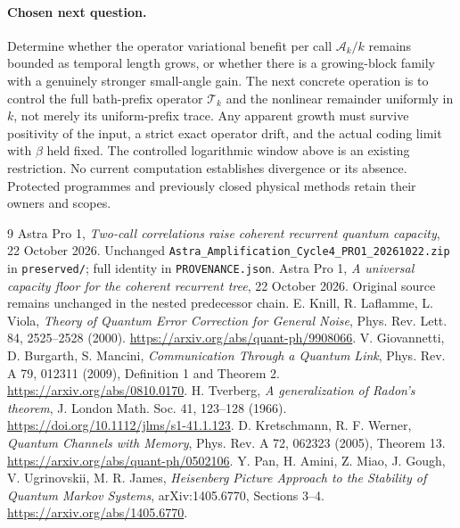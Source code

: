 \documentclass[11pt]{article}
\begin{document}
\paragraph{Chosen next question.}
Determine whether the operator variational benefit per call
$\mathcal A_k/k$ remains bounded as temporal length grows, or whether
there is a growing-block family with a genuinely stronger small-angle
gain. The next concrete operation is to control the full bath-prefix
operator $\mathcal T_k$ and the nonlinear remainder uniformly in $k$,
not merely its uniform-prefix trace.
Any apparent growth must survive positivity of the input, a strict exact
operator drift, and the actual coding limit with $\beta$ held fixed.
The controlled logarithmic window above is an existing restriction.
No current computation establishes divergence or its absence.
Protected programmes and previously closed physical methods retain
their owners and scopes.

\appendix

\begin{thebibliography}{9}\footnotesize
{} Astra Pro 1, \emph{Two-call correlations raise coherent
recurrent quantum capacity}, 22 October 2026.
Unchanged \texttt{Astra\_Amplification\_Cycle4\_PRO1\_20261022.zip}
in \texttt{preserved/}; full identity in \texttt{PROVENANCE.json}.
 Astra Pro 1, \emph{A universal capacity floor for the
coherent recurrent tree}, 22 October 2026. Original source remains
unchanged in the nested predecessor chain.
 E. Knill, R. Laflamme, L. Viola,
\emph{Theory of Quantum Error Correction for General Noise},
Phys. Rev. Lett. 84, 2525--2528 (2000).
\url{https://arxiv.org/abs/quant-ph/9908066}.
 V. Giovannetti, D. Burgarth, S. Mancini,
\emph{Communication Through a Quantum Link},
Phys. Rev. A 79, 012311 (2009), Definition 1 and Theorem 2.
\url{https://arxiv.org/abs/0810.0170}.
 H. Tverberg,
\emph{A generalization of Radon's theorem},
J. London Math. Soc. 41, 123--128 (1966).
\url{https://doi.org/10.1112/jlms/s1-41.1.123}.
 D. Kretschmann, R. F. Werner,
\emph{Quantum Channels with Memory},
Phys. Rev. A 72, 062323 (2005), Theorem 13.
\url{https://arxiv.org/abs/quant-ph/0502106}.
 Y. Pan, H. Amini, Z. Miao, J. Gough, V. Ugrinovskii,
M. R. James, \emph{Heisenberg Picture Approach to the Stability of
Quantum Markov Systems}, arXiv:1405.6770, Sections 3--4.
\url{https://arxiv.org/abs/1405.6770}.
\end{thebibliography}
\end{document}
